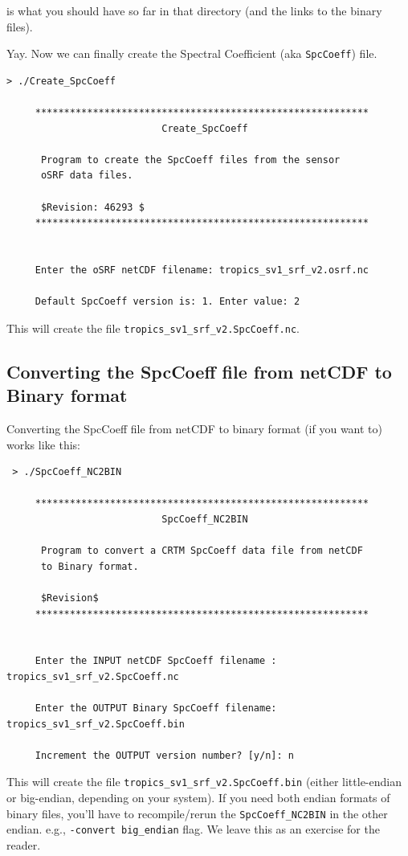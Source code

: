 is what you should have so far in that directory (and the links to the binary files).

Yay.  Now we can finally create the Spectral Coefficient (aka \verb|SpcCoeff|) file.   
\begin{verbatim}
> ./Create_SpcCoeff 

     **********************************************************
                           Create_SpcCoeff

      Program to create the SpcCoeff files from the sensor 
      oSRF data files.

      $Revision: 46293 $
     **********************************************************


     Enter the oSRF netCDF filename: tropics_sv1_srf_v2.osrf.nc

     Default SpcCoeff version is: 1. Enter value: 2

\end{verbatim}
This will create the file \verb|tropics_sv1_srf_v2.SpcCoeff.nc|.

\subsection{Converting the SpcCoeff file from netCDF to Binary format}
Converting the SpcCoeff file from netCDF to binary format (if you want to) works like this:
\begin{verbatim}
 > ./SpcCoeff_NC2BIN 

     **********************************************************
                           SpcCoeff_NC2BIN

      Program to convert a CRTM SpcCoeff data file from netCDF 
      to Binary format.

      $Revision$
     **********************************************************


     Enter the INPUT netCDF SpcCoeff filename : tropics_sv1_srf_v2.SpcCoeff.nc

     Enter the OUTPUT Binary SpcCoeff filename: tropics_sv1_srf_v2.SpcCoeff.bin

     Increment the OUTPUT version number? [y/n]: n
\end{verbatim}
This will create the file \verb|tropics_sv1_srf_v2.SpcCoeff.bin| (either little-endian or big-endian, depending on your system).
If you need both endian formats of binary files, you'll have to recompile/rerun the \verb|SpcCoeff_NC2BIN| in the other endian.  e.g., \verb|-convert big_endian| flag.   We leave this as an exercise for the reader.

